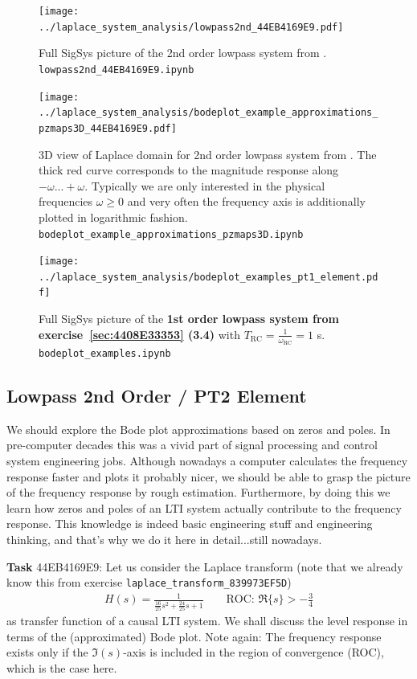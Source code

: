 \begin{figure}
  \texttt{[image: ../laplace\_system\_analysis/lowpass2nd\_44EB4169E9.pdf]}
  \caption{Full SigSys picture of the 2nd order lowpass system from
  . \texttt{lowpass2nd\_44EB4169E9.ipynb}}
  \label{fig:lowpass2nd_44EB4169E9}
\end{figure}


\begin{figure}
  \texttt{[image: ../laplace\_system\_analysis/bodeplot\_example\_approximations\_pzmaps3D\_44EB4169E9.pdf]}
  \caption{3D view of Laplace domain for 2nd order lowpass system from
  .
  The thick red curve corresponds to the magnitude response along $-\omega...+\omega$.
  Typically we are only interested in the physical frequencies $\omega\geq0$ and
  very often the frequency axis is additionally plotted in logarithmic fashion.
  \texttt{bodeplot\_example\_approximations\_pzmaps3D.ipynb}}
  \label{fig:bodeplot_example_approximations_pzmaps3D_44EB4169E9}
\end{figure}




\begin{figure}
  \texttt{[image: ../laplace\_system\_analysis/bodeplot\_examples\_pt1\_element.pdf]}
  \caption{Full SigSys picture of the \textbf{1st order lowpass system from
  exercise~\ref{sec:4408E33353} (3.4)} with $T_\mathrm{RC} = \frac{1}{\omega_\mathrm{RC}} = 1$ s.
  \texttt{bodeplot\_examples.ipynb}}
  \label{fig:bodeplot_examples_pt1_element}
\end{figure}



\newpage
\subsection{Lowpass 2nd Order / PT2 Element}
\label{sec:44EB4169E9}
\begin{Ziel}
We should explore the Bode plot approximations based on zeros and poles.
In pre-computer decades this was a vivid part of signal
processing and control system engineering jobs.
Although nowadays a computer calculates the frequency response faster and plots it
probably nicer, we should be able to grasp the picture of the frequency response
by rough estimation. Furthermore, by doing this we learn how zeros and poles
of an LTI system actually  contribute to the frequency response. This knowledge
is indeed basic engineering stuff and engineering thinking, and that's why we do
it here in detail...still nowadays.
\end{Ziel}
\textbf{Task} {\tiny 44EB4169E9}:
Let us consider the Laplace transform (note that we already know this from
exercise \texttt{laplace\_transform\_839973EF5D})
\begin{align}
\label{eq:H_ODE}
H(s) = \frac{1}{\frac{16}{25} s^2 + \frac{24}{25} s + 1}\qquad\text{ROC: }
\Re\{s\}>-\frac{3}{4}
\end{align}
as transfer function of a causal LTI system.
%
We shall discuss the level response in terms of the (approximated) Bode plot.
%
Note again: The frequency response exists only if the $\Im(s)$-axis is included
in the region of convergence (ROC), which is the case here.

